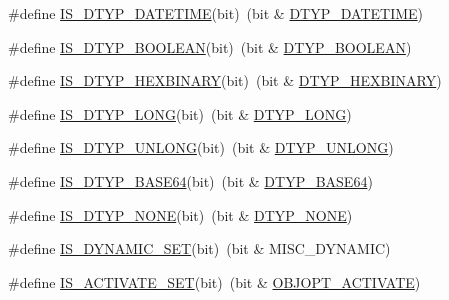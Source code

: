 \begin{DoxyCompactItemize}
\#define \hyperlink{group__LIBHELP_ga46d6ec5838128f28e404031b6c5b81dd}{I\-S\-\_\-\-D\-T\-Y\-P\-\_\-\-D\-A\-T\-E\-T\-I\-M\-E}(bit)~(bit \& \hyperlink{group__LIBHELP_ggad9971b6ef33e02ba2c75d19c1d2518a1a2271764ae7fc34b395cc47fd4aacfbf8}{D\-T\-Y\-P\-\_\-\-D\-A\-T\-E\-T\-I\-M\-E})
\item 
\#define \hyperlink{group__LIBHELP_gaf808e5d9a8ebcbac5fc2f2cdea42b97e}{I\-S\-\_\-\-D\-T\-Y\-P\-\_\-\-B\-O\-O\-L\-E\-A\-N}(bit)~(bit \& \hyperlink{group__LIBHELP_ggad9971b6ef33e02ba2c75d19c1d2518a1af076808b8b426548ec7e421c8ba2d84c}{D\-T\-Y\-P\-\_\-\-B\-O\-O\-L\-E\-A\-N})
\item 
\#define \hyperlink{group__LIBHELP_ga88cc42098bf9839eee8487256fb03b6f}{I\-S\-\_\-\-D\-T\-Y\-P\-\_\-\-H\-E\-X\-B\-I\-N\-A\-R\-Y}(bit)~(bit \& \hyperlink{group__LIBHELP_ggad9971b6ef33e02ba2c75d19c1d2518a1a9ae015b94ea618a36598f920e6c52bb9}{D\-T\-Y\-P\-\_\-\-H\-E\-X\-B\-I\-N\-A\-R\-Y})
\item 
\#define \hyperlink{group__LIBHELP_ga8aa8438fb1184d5542ccf6af452e85bc}{I\-S\-\_\-\-D\-T\-Y\-P\-\_\-\-L\-O\-N\-G}(bit)~(bit \& \hyperlink{group__LIBHELP_ggad9971b6ef33e02ba2c75d19c1d2518a1a3b20b853e79af4d4cca0e90dc964c49b}{D\-T\-Y\-P\-\_\-\-L\-O\-N\-G})
\item 
\#define \hyperlink{group__LIBHELP_ga56688137464eb65d6baa796bb8872cc4}{I\-S\-\_\-\-D\-T\-Y\-P\-\_\-\-U\-N\-L\-O\-N\-G}(bit)~(bit \& \hyperlink{group__LIBHELP_ggad9971b6ef33e02ba2c75d19c1d2518a1aa20a92678dab5062d123c3c5329c2fe8}{D\-T\-Y\-P\-\_\-\-U\-N\-L\-O\-N\-G})
\item 
\#define \hyperlink{group__LIBHELP_gaa27960f05b9cf62b3f164d7b9e63f0d1}{I\-S\-\_\-\-D\-T\-Y\-P\-\_\-\-B\-A\-S\-E64}(bit)~(bit \& \hyperlink{group__LIBHELP_ggad9971b6ef33e02ba2c75d19c1d2518a1a15076a00e5cb73882f567c75ad3cf047}{D\-T\-Y\-P\-\_\-\-B\-A\-S\-E64})
\item 
\#define \hyperlink{group__LIBHELP_gaf98bb58e2c980b68277c7ec03ce20ef0}{I\-S\-\_\-\-D\-T\-Y\-P\-\_\-\-N\-O\-N\-E}(bit)~(bit \& \hyperlink{group__LIBHELP_ggad9971b6ef33e02ba2c75d19c1d2518a1a5099efee987d5775c2690287dadc2eb8}{D\-T\-Y\-P\-\_\-\-N\-O\-N\-E})
\item 
\#define \hyperlink{group__LIBHELP_ga88635b2ca475fa1e9fbf2bd1e151f920}{I\-S\-\_\-\-D\-Y\-N\-A\-M\-I\-C\-\_\-\-S\-E\-T}(bit)~(bit \& M\-I\-S\-C\-\_\-\-D\-Y\-N\-A\-M\-I\-C)
\item 
\#define \hyperlink{group__LIBHELP_ga36d2d4812ed8182cf464f0af365f9155}{I\-S\-\_\-\-A\-C\-T\-I\-V\-A\-T\-E\-\_\-\-S\-E\-T}(bit)~(bit \& \hyperlink{group__LIBHELP_gga63865642181d8ac749852d657efc4bd8ac8d0d094247d75b15be20de57af72617}{O\-B\-J\-O\-P\-T\-\_\-\-A\-C\-T\-I\-V\-A\-T\-E})

\end{DoxyCompactItemize}
